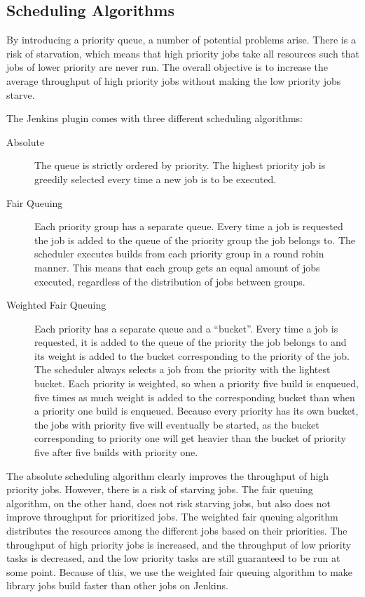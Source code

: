 \subsection{Scheduling Algorithms}
By introducing a priority queue, a number of potential problems arise. There is a risk of starvation, which means that high priority jobs take all resources such that jobs of lower priority are never run. The overall objective is to increase the average throughput of high priority jobs without making the low priority jobs starve.

The Jenkins plugin comes with three different scheduling algorithms:

\begin{description}
  \item[Absolute] The queue is strictly ordered by priority. The highest priority job is greedily selected every time a new job is to be executed.
  \item[Fair Queuing] Each priority group has a separate queue. Every time a job is requested the job is added to the queue of the priority group the job belongs to. The scheduler executes builds from each priority group in a round robin manner. This means that each group gets an equal amount of jobs executed, regardless of the distribution of jobs between groups.
  \item[Weighted Fair Queuing] Each priority has a separate queue and a ``bucket''. Every time a job is requested, it is added to the queue of the priority the job belongs to and its weight is added to the bucket corresponding to the priority of the job. The scheduler always selects a job from the priority with the lightest bucket. Each priority is weighted, so when a priority five build is enqueued, five times as much weight is added to the corresponding bucket than when a priority one build is enqueued. Because every priority has its own bucket, the jobs with priority five will eventually be started, as the bucket corresponding to priority one will get heavier than the bucket of priority five after five builds with priority one.
\end{description}

The absolute scheduling algorithm clearly improves the throughput of high priority jobs. However, there is a risk of starving jobs. The fair queuing algorithm, on the other hand, does not risk starving jobs, but also does not improve throughput for prioritized jobs. The weighted fair queuing algorithm distributes the resources among the different jobs based on their priorities. The throughput of high priority jobs is increased, and the throughput of low priority tasks is decreased, and the low priority tasks are still guaranteed to be run at some point. Because of this, we use the weighted fair queuing algorithm to make library jobs build faster than other jobs on Jenkins.

